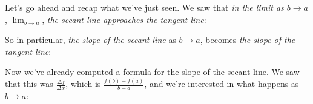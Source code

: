 \documentclass[pdftex, brazil, 12pt, twoside]{article}
\begin{document}
Let's go ahead and recap what we've just seen.
We saw that \emph{in the limit as $b \to a$}, $\displaystyle \lim_{b \to a}$,
\emph{the secant line approaches the tangent line}:

\begin{figure}[H]
  \begin{center}
  \end{center}
\end{figure}

So in particular, \emph{the slope of the secant line} as $b \to a$,
becomes \emph{the slope of the tangent line}:

\begin{figure}[H]
  \begin{center}
  \end{center}
\end{figure}

Now we've already computed a formula for the slope
of the secant line.
We saw that this was $\displaystyle \frac{\Delta f}{\Delta x}$, which
is $\displaystyle \frac{f(b) - f(a)}{b-a}$,
and we're interested in what happens as $b \to a$:
\end{document}

